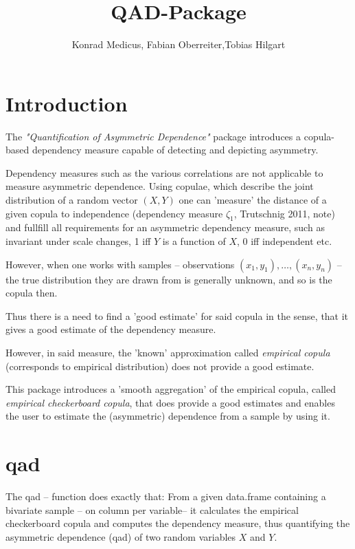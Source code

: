 \documentclass{scrartcl}\usepackage[]{graphicx}\usepackage[]{color}
\author{Konrad Medicus, Fabian Oberreiter,Tobias Hilgart}
\begin{document}
\title{QAD-Package}

\maketitle

\tableofcontents

\section{Introduction}

The \textit{"Quantification of Asymmetric Dependence"} package introduces a copula-based dependency measure capable of detecting and depicting asymmetry.

Dependency measures such as the various correlations are not applicable to measure asymmetric dependence. Using copulae, which describe the joint distribution of a random vector $(X,Y)$ one can 'measure' the distance of a given copula to independence (dependency measure $\zeta_1$, Trutschnig 2011, note) and fullfill all requirements for an asymmetric dependency measure, such as invariant under scale changes, 1 iff $Y$ is a function of $X$, 0 iff independent etc.

However, when one works with samples -- observations $(x_1,y_1),\dots,(x_n,y_n)$ -- the true distribution they are drawn from is generally unknown, and so is the copula then.

Thus there is a need to find a 'good estimate' for said copula in the sense, that it gives a good estimate of the dependency measure.

However, in said measure, the 'known' approximation called \textit{empirical copula} (corresponds to empirical distribution) does not provide a good estimate.

This package introduces a 'smooth aggregation' of the empirical copula, called \textit{empirical checkerboard copula}, that does provide a good estimates and enables the user to estimate the (asymmetric) dependence from a sample by using it.

\section{qad}

The qad -- function does exactly that: From a given data.frame containing a bivariate sample -- on column per variable-- it calculates the empirical checkerboard copula and computes the dependency measure, thus quantifying the asymmetric dependence (qad) of two random variables $X$ and $Y$.
\end{document}
